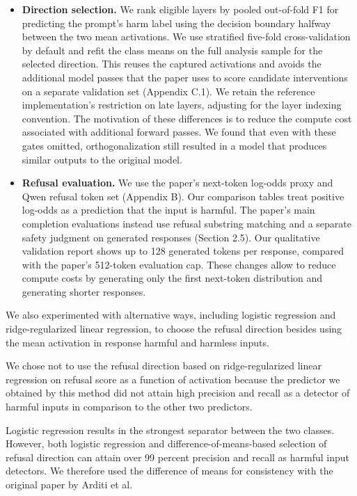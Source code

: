 \documentclass[10pt,letterpaper]{article}
\begin{document}
\begin{itemize}
    \item \textbf{Direction selection.} We rank eligible layers by pooled out-of-fold F1 for predicting the prompt's harm label using the decision boundary halfway between the two mean activations. We use stratified five-fold cross-validation by default and refit the class means on the full analysis sample for the selected direction. This reuses the captured activations and avoids the additional model passes that the paper uses to score candidate interventions on a separate validation set (Appendix C.1). We retain the reference implementation's restriction on late layers, adjusting for the layer indexing convention. The motivation of these differences is to reduce the compute cost associated with additional forward passes. We found that even with these gates omitted, orthogonalization still resulted in a model that produces similar outputs to the original model.

    \item \textbf{Refusal evaluation.} We use the paper's next-token log-odds proxy and Qwen refusal token set (Appendix B). Our comparison tables treat positive log-odds as a prediction that the input is harmful. The paper's main completion evaluations instead use refusal substring matching and a separate safety judgment on generated responses (Section 2.5). Our qualitative validation report shows up to 128 generated tokens per response, compared with the paper's 512-token evaluation cap. These changes allow to reduce compute costs by generating only the first next-token distribution and generating shorter responses.

\end{itemize}

We also experimented with alternative ways, including logistic regression and ridge-regularized linear regression, to choose the refusal direction besides using the mean activation in response harmful and harmless inputs.
    
We chose not to use the refusal direction based on ridge-regularized linear regression on refusal score as a function of activation because the predictor we obtained by this method did not attain high precision and recall as a detector of harmful inputs in comparison to the other two predictors.

Logistic regression results in the strongest separator between the two classes. However, both logistic regression and difference-of-means-based selection of refusal direction can attain over 99 percent precision and recall as harmful input detectors. We therefore used the difference of means for consistency with the original paper by Arditi et al.
\end{document}
